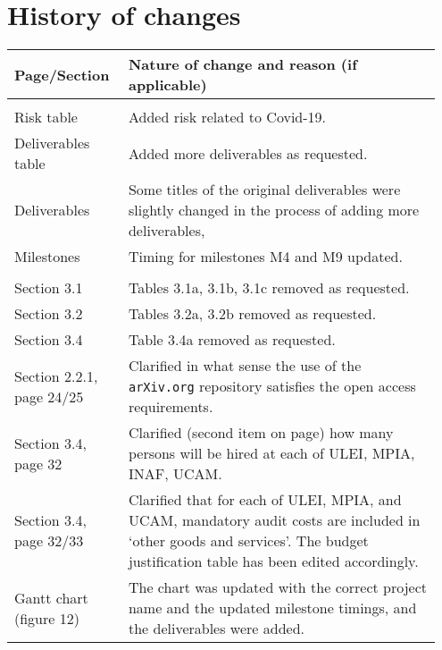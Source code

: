 \section*{History of changes}

\begin{tabular}{|>{\raggedright}p{0.25\linewidth}|>{\raggedright}p{0.7\linewidth}|}
\hline
\textbf{Page/Section} & \textbf{Nature of change and reason (if applicable)} \tabularnewline
\hline
\multicolumn{2}{|l|}{\textbf{Part A}} \tabularnewline
\hline
Risk table & Added risk related to Covid-19. \tabularnewline
\hline
Deliverables table & Added more deliverables as requested. \tabularnewline
\hline
Deliverables & Some titles of the original deliverables were slightly changed in the process of adding more deliverables, \tabularnewline
\hline
Milestones & Timing for milestones M4 and M9 updated. \tabularnewline
\hline
\multicolumn{2}{|l|}{\textbf{Part B}} \tabularnewline
\hline
Section 3.1 & Tables 3.1a, 3.1b, 3.1c removed as requested. \tabularnewline
\hline
Section 3.2 & Tables 3.2a, 3.2b removed as requested. \tabularnewline
\hline
Section 3.4 & Table 3.4a removed as requested. \tabularnewline
\hline
Section 2.2.1, page 24/25 & Clarified in what sense the use of the \texttt{arXiv.org} repository satisfies the open access requirements. \tabularnewline
\hline
Section 3.4, page 32 & Clarified (second item on page) how many persons will be hired at each of ULEI, MPIA, INAF, UCAM. \tabularnewline
\hline
Section 3.4, page 32/33 & Clarified that for each of ULEI, MPIA, and UCAM, mandatory audit costs are included in `other goods and services'. The budget justification table has been edited accordingly. \tabularnewline
\hline 
Gantt chart (figure 12) & The chart was updated with the correct project name and the updated milestone timings, and the deliverables were added. \tabularnewline
\hline
\end{tabular}